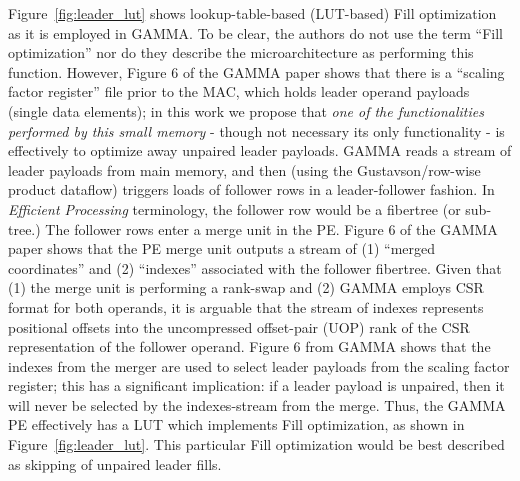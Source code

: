 Figure~\ref{fig:leader_lut} shows lookup-table-based (LUT-based) Fill optimization as it is employed in GAMMA\cite{gamma}. To be clear, the authors do not use the term ``Fill optimization'' nor do they describe the microarchitecture as performing this function. However, Figure 6\cite{gamma} of the GAMMA paper shows that there is a ``scaling factor register'' file prior to the MAC, which holds leader operand payloads (single data elements); in this work we propose that \textit{one of the functionalities performed by this small memory} - though not necessary its only functionality - is effectively to optimize away unpaired leader payloads. GAMMA reads a stream of leader payloads from main memory, and then (using the Gustavson/row-wise product dataflow\cite{gamma}) triggers loads of follower rows in a leader-follower fashion. In \textit{Efficient Processing} terminology, the follower row would be a fibertree (or sub-tree.) The follower rows enter a merge unit in the PE. Figure 6\cite{gamma} of the GAMMA paper shows that the PE merge unit outputs a stream of (1) ``merged coordinates'' and (2) ``indexes'' associated with the follower fibertree. Given that (1) the merge unit is performing a rank-swap\cite{teaal} and (2) GAMMA employs CSR format for both operands, it is arguable that the stream of indexes represents positional offsets into the uncompressed offset-pair (UOP) rank of the CSR representation of the follower operand. Figure 6\cite{gamma} from GAMMA shows that the indexes from the merger are used to select leader payloads from the scaling factor register; this has a significant implication: if a leader payload is unpaired, then it will never be selected by the indexes-stream from the merge. Thus, the GAMMA PE effectively has a LUT which implements Fill optimization, as shown in Figure~\ref{fig:leader_lut}. This particular Fill optimization would be best described as skipping of unpaired leader fills.

